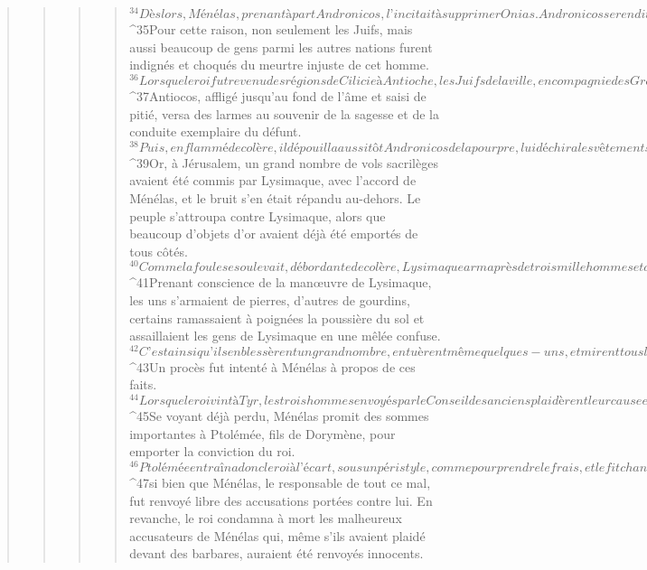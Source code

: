 \begin{verse}
\begin{verse}
\begin{verse}
\begin{verse}
${}^{34}Dès lors, Ménélas, prenant à part Andronicos, l’incitait à supprimer Onias. Andronicos se rendit alors auprès d’Onias : confiant dans sa propre ruse, il lui tendit la main droite en s’engageant sous serment, et malgré le soupçon qu’il inspirait, il le décida à sortir de son asile. Alors, aussitôt, il le mit à mort, au mépris de toute justice. 
${}^{35}Pour cette raison, non seulement les Juifs, mais aussi beaucoup de gens parmi les autres nations furent indignés et choqués du meurtre injuste de cet homme.
${}^{36}Lorsque le roi fut revenu des régions de Cilicie à Antioche, les Juifs de la ville, en compagnie des Grecs qui partageaient leur haine du mal, vinrent le trouver au sujet du meurtre injustifié d’Onias. 
${}^{37}Antiocos, affligé jusqu’au fond de l’âme et saisi de pitié, versa des larmes au souvenir de la sagesse et de la conduite exemplaire du défunt. 
${}^{38}Puis, enflammé de colère, il dépouilla aussitôt Andronicos de la pourpre, lui déchira les vêtements et le fit mener, à travers toute la ville, à l’endroit même où il avait porté une main sacrilège sur Onias. Là, il exécuta le meurtrier. Le Seigneur lui infligea ainsi le châtiment qu’il méritait.
${}^{39}Or, à Jérusalem, un grand nombre de vols sacrilèges avaient été commis par Lysimaque, avec l’accord de Ménélas, et le bruit s’en était répandu au-dehors. Le peuple s’attroupa contre Lysimaque, alors que beaucoup d’objets d’or avaient déjà été emportés de tous côtés. 
${}^{40}Comme la foule se soulevait, débordante de colère, Lysimaque arma près de trois mille hommes et donna le signal d’injustes violences, sous le commandement d’un certain Auranos, un homme avancé en âge et non moins en folie. 
${}^{41}Prenant conscience de la manœuvre de Lysimaque, les uns s’armaient de pierres, d’autres de gourdins, certains ramassaient à poignées la poussière du sol et assaillaient les gens de Lysimaque en une mêlée confuse. 
${}^{42}C’est ainsi qu’ils en blessèrent un grand nombre, en tuèrent même quelques-uns, et mirent tous les autres en fuite. Quant au voleur sacrilège lui-même, ils le supprimèrent près de la salle du trésor.
${}^{43}Un procès fut intenté à Ménélas à propos de ces faits. 
${}^{44}Lorsque le roi vint à Tyr, les trois hommes envoyés par le Conseil des anciens plaidèrent leur cause en sa présence. 
${}^{45}Se voyant déjà perdu, Ménélas promit des sommes importantes à Ptolémée, fils de Dorymène, pour emporter la conviction du roi. 
${}^{46}Ptolémée entraîna donc le roi à l’écart, sous un péristyle, comme pour prendre le frais, et le fit changer d’avis, 
${}^{47}si bien que Ménélas, le responsable de tout ce mal, fut renvoyé libre des accusations portées contre lui. En revanche, le roi condamna à mort les malheureux accusateurs de Ménélas qui, même s’ils avaient plaidé devant des barbares, auraient été renvoyés innocents. 

\end{verse}
\end{verse}
\end{verse}
\end{verse}
